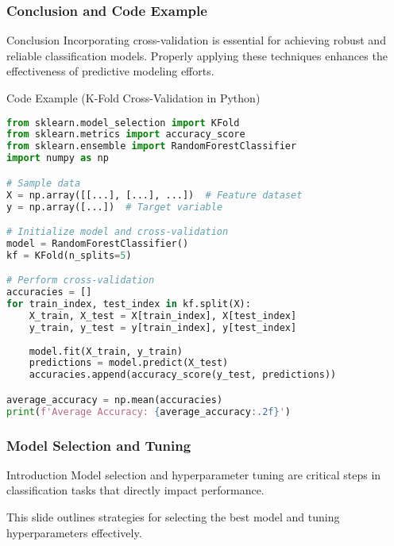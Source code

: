 \documentclass[aspectratio=169]{beamer}
\begin{document}
\begin{frame}[fragile]
    \frametitle{Conclusion and Code Example}
    \begin{block}{Conclusion}
        Incorporating cross-validation is essential for achieving robust and reliable classification models. 
        Properly applying these techniques enhances the effectiveness of predictive modeling efforts.
    \end{block}

    \begin{block}{Code Example (K-Fold Cross-Validation in Python)}
        \begin{lstlisting}[language=Python]
from sklearn.model_selection import KFold
from sklearn.metrics import accuracy_score
from sklearn.ensemble import RandomForestClassifier
import numpy as np

# Sample data
X = np.array([[...], [...], ...])  # Feature dataset
y = np.array([...])  # Target variable

# Initialize model and cross-validation
model = RandomForestClassifier()
kf = KFold(n_splits=5)

# Perform cross-validation
accuracies = []
for train_index, test_index in kf.split(X):
    X_train, X_test = X[train_index], X[test_index]
    y_train, y_test = y[train_index], y[test_index]
    
    model.fit(X_train, y_train)
    predictions = model.predict(X_test)
    accuracies.append(accuracy_score(y_test, predictions))

average_accuracy = np.mean(accuracies)
print(f'Average Accuracy: {average_accuracy:.2f}')
        \end{lstlisting}
    \end{block}
\end{frame}

\begin{frame}[fragile]
    \frametitle{Model Selection and Tuning}
    \begin{block}{Introduction}
        Model selection and hyperparameter tuning are critical steps in classification tasks that directly impact performance.
    \end{block}
    This slide outlines strategies for selecting the best model and tuning hyperparameters effectively.
\end{frame}
\end{document}
